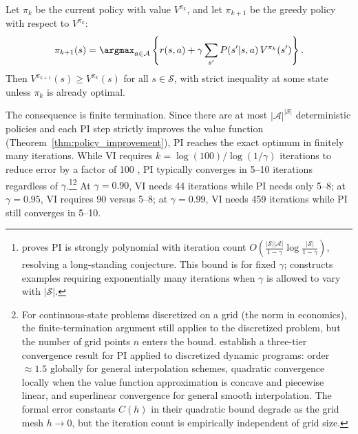 \begin{theorem}
\label{thm:policy_improvement}
Let $\pi_k$ be the current policy with value $V^{\pi_k}$, and let $\pi_{k+1}$ be the greedy policy with respect to $V^{\pi_k}$:
\begin{equation}
\pi_{k+1}(s) = \argmax_{a \in \mathcal{A}} \left\{ r(s,a) + \gamma \sum_{s'} P(s'|s,a)\, V^{\pi_k}(s') \right\}.
\end{equation}
Then $V^{\pi_{k+1}}(s) \geq V^{\pi_k}(s)$ for all $s \in \mathcal{S}$, with strict inequality at some state unless $\pi_k$ is already optimal.
\end{theorem}

The consequence is finite termination. Since there are at most $|\mathcal{A}|^{|\mathcal{S}|}$ deterministic policies and each PI step strictly improves the value function (Theorem~\ref{thm:policy_improvement}), PI reaches the exact optimum in finitely many iterations. While VI requires $k = \log(100) / \log(1/\gamma)$ iterations to reduce error by a factor of 100 \citep{bertsekas1996}, PI typically converges in 5--10 iterations regardless of $\gamma$.\footnote{\citet{ye2011} proves PI is strongly polynomial with iteration count $O\!\left(\frac{|\mathcal{S}||\mathcal{A}|}{1-\gamma}\log\frac{|\mathcal{S}|}{1-\gamma}\right)$, resolving a long-standing conjecture. This bound is for fixed $\gamma$; \citet{fearnley2010} constructs examples requiring exponentially many iterations when $\gamma$ is allowed to vary with $|\mathcal{S}|$.}\footnote{For continuous-state problems discretized on a grid (the norm in economics), the finite-termination argument still applies to the discretized problem, but the number of grid points $n$ enters the bound. \citet{santos2004} establish a three-tier convergence result for PI applied to discretized dynamic programs: order $\approx 1.5$ globally for general interpolation schemes, quadratic convergence locally when the value function approximation is concave and piecewise linear, and superlinear convergence for general smooth interpolation. The formal error constants $C(h)$ in their quadratic bound degrade as the grid mesh $h \to 0$, but the iteration count is empirically independent of grid size.} At $\gamma = 0.90$, VI needs 44 iterations while PI needs only 5--8; at $\gamma = 0.95$, VI requires 90 versus 5--8; at $\gamma = 0.99$, VI needs 459 iterations while PI still converges in 5--10.

